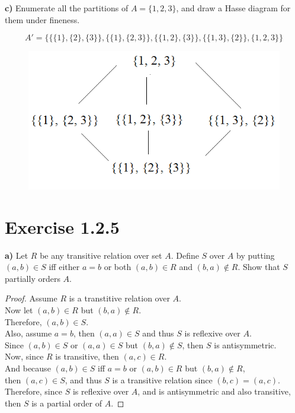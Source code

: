 \documentclass[titlepage, letterpaper, fleqn]{article}
\newcommand{\spacepls}{\vspace{5mm}}
\begin{document}
\spacepls

{\large \textbf{c)} Enumerate all the partitions of \(A = \{1,2,3\}\), and draw a Hasse diagram for them under fineness.}

\[A' = \{\{\{1\}, \{2\}, \{3\}\}, \{\{1\},\{2,3\}\}, \{\{1,2\},\{3\}\}, \{\{1,3\},\{2\}\}, \{1, 2, 3\}\}\]

\begin{figure}[h]
\includegraphics[width=0.5\linewidth]{hasse}
\centering
\end{figure}

\section{Exercise 1.2.5}

{\large \textbf{a)} Let \(R\) be any transitive relation over set \(A\).
Define \(S\) over \(A\) by putting \((a,b) \in S\) iff either \(a=b\) or both \((a,b) \in R\) and \((b,a) \not \in R\).
Show that \(S\) partially orders \(A\).}

\begin{proof}
Assume \(R\) is a transtitive relation over \(A\).\\
Now let \((a,b) \in R\) but \((b,a) \not \in R\).\\
Therefore, \((a,b) \in S\).\\
Also, assume \(a = b\), then \((a,a) \in S\) and thus \(S\) is reflexive over \(A\).\\
Since \((a,b) \in S\) or \((a,a) \in S\) but \((b,a) \not \in S\), then \(S\) is antisymmetric.\\
Now, since \(R\) is transitive, then \((a,c) \in R\).\\
And because \((a,b) \in S\) iff \(a=b\) or \((a,b) \in R\) but \((b,a) \not \in R\),\\
then \((a,c) \in S\), and thus \(S\) is a transitive relation since \((b,c) = (a,c)\).\\
Therefore, since \(S\) is reflexive over \(A\), and is antisymmetric and also transitive,\\
then \(S\) is a partial order of \(A\).
\end{proof}
\end{document}
